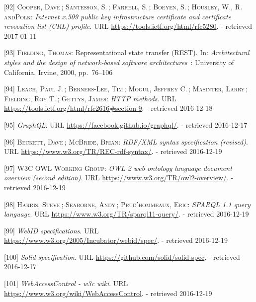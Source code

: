 \documentclass[12pt,english,a4paper,titlepage,cleardoublepage=empty,dottedtoc]{report}
\begin{document}
\hypertarget{ref-web_spec_x509}{}
{[}92{]} \textsc{Cooper, Dave}\,; \textsc{Santesson, S.}\,;
\textsc{Farrell, S.}\,; \textsc{Boeyen, S.}\,; \textsc{Housley, W.,
\textnormal{R. andPolk}}: \emph{Internet x.509 public key infrastructure
certificate and certificate revocation list (CRL) profile}. URL
\url{https://tools.ietf.org/html/rfc5280}. - retrieved 2017-01-11

\hypertarget{ref-web_spec_rest}{}
{[}93{]} \textsc{Fielding, Thomas}: Representational state transfer
(REST). In: \emph{Architectural styles and the design of network-based
software architectures}~: University of California, Irvine, 2000,
pp.~76--106

\hypertarget{ref-web_spec_http-methods}{}
{[}94{]} \textsc{Leach, Paul J.}\,; \textsc{Berners-Lee, Tim}\,;
\textsc{Mogul, Jeffrey C.}\,; \textsc{Masinter, Larry}\,;
\textsc{Fielding, Roy T.}\,; \textsc{Gettys, James}: \emph{HTTP
methods}. URL \url{https://tools.ietf.org/html/rfc2616\#section-9}. -
retrieved 2016-12-18

\hypertarget{ref-web_spec_graphql}{}
{[}95{]} \emph{GraphQL}. URL \url{https://facebook.github.io/graphql/}.
- retrieved 2016-12-17

\hypertarget{ref-web_w3c-tr_rdf}{}
{[}96{]} \textsc{Beckett, Dave}\,; \textsc{McBride, Brian}:
\emph{RDF/XML syntax specification (revised)}. URL
\url{https://www.w3.org/TR/REC-rdf-syntax/}. - retrieved 2016-12-19

\hypertarget{ref-web_w3c-tr_owl}{}
{[}97{]} \textsc{W3C OWL Working Group}: \emph{OWL 2 web ontology
language document overview (second edition)}. URL
\url{https://www.w3.org/TR/owl2-overview/}. - retrieved 2016-12-19

\hypertarget{ref-web_w3c-tr_sparql}{}
{[}98{]} \textsc{Harris, Steve}\,; \textsc{Seaborne, Andy}\,;
\textsc{Prud'hommeaux, Eric}: \emph{SPARQL 1.1 query language}. URL
\url{https://www.w3.org/TR/sparql11-query/}. - retrieved 2016-12-19

\hypertarget{ref-web_w3c-draft_webid}{}
{[}99{]} \emph{WebID specifications}. URL
\url{https://www.w3.org/2005/Incubator/webid/spec/}. - retrieved
2016-12-19

\hypertarget{ref-web_spec_solid}{}
{[}100{]} \emph{Solid specification}. URL
\url{https://github.com/solid/solid-spec}. - retrieved 2016-12-17

\hypertarget{ref-web_2016_wiki_webaccesscontrol}{}
{[}101{]} \emph{WebAccessControl - w3c wiki}. URL
\url{https://www.w3.org/wiki/WebAccessControl}. - retrieved 2016-12-19
\end{document}
